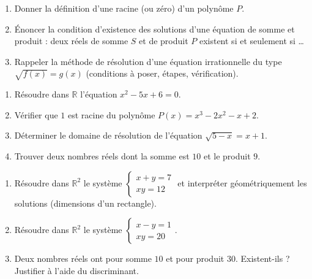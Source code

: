 \documentclass[11pt]{article}
\newcounter{popsec}
\newcounter{popsub}
\newcommand{\courssub}[1]{%
  \stepcounter{popsub}%
  \par\vspace{9pt}\noindent{\popxbold\fontsize{11.5}{13}\selectfont\color{popink}{\color{poporange}\thepopsec.\thepopsub}\hspace{6pt}#1}\par\nopagebreak\vspace{4pt}
}
\begin{document}
\begin{exercice}
\begin{enumerate}
\item Donner la définition d'une racine (ou zéro) d'un polynôme $P$.
\item Énoncer la condition d'existence des solutions d'une équation de somme et produit : deux réels de somme $S$ et de produit $P$ existent si et seulement si \ldots
\item Rappeler la méthode de résolution d'une équation irrationnelle du type $\sqrt{f(x)} = g(x)$ (conditions à poser, étapes, vérification).
\end{enumerate}
\end{exercice}

\begin{exercice}
\begin{enumerate}
\item Résoudre dans $\mathbb{R}$ l'équation $x^2 - 5x + 6 = 0$.
\item Vérifier que $1$ est racine du polynôme $P(x) = x^3 - 2x^2 - x + 2$.
\item Déterminer le domaine de résolution de l'équation $\sqrt{5 - x} = x + 1$.
\item Trouver deux nombres réels dont la somme est $10$ et le produit $9$.
\end{enumerate}
\end{exercice}

\courssub{Je m'entraîne}

\begin{exercice}
\begin{enumerate}
\item Résoudre dans $\mathbb{R}^2$ le système $\begin{cases} x + y = 7 \\ xy = 12 \end{cases}$ et interpréter géométriquement les solutions (dimensions d'un rectangle).
\item Résoudre dans $\mathbb{R}^2$ le système $\begin{cases} x - y = 1 \\ xy = 20 \end{cases}$.
\item Deux nombres réels ont pour somme $10$ et pour produit $30$. Existent-ils ? Justifier à l'aide du discriminant.
\end{enumerate}
\end{exercice}
\end{document}
